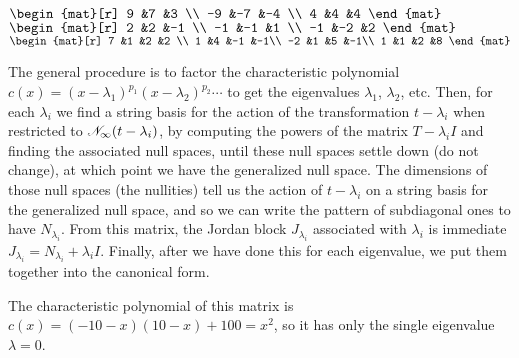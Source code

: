 \begin{exercises}
\begin{exparts}
      \partsitem
        \(
        \begin{mat}[r]
           9   &7    &3  \\
          -9   &-7   &-4 \\
           4   &4    &4
        \end{mat} \)
      \partsitem 
        \(
        \begin{mat}[r]
           2   &2    &-1 \\
          -1   &-1   &1  \\
          -1   &-2   &2
        \end{mat} \)
      \partsitem 
        \(
        \begin{mat}[r]
           7   &1    &2   &2 \\
           1   &4    &-1  &-1\\
          -2   &1    &5   &-1\\
           1   &1    &2   &8
        \end{mat} \)
    \end{exparts}
    \begin{answer}
      The general procedure is to factor the characteristic polynomial 
      $c(x)=(x-\lambda_1)^{p_1}(x-\lambda_2)^{p_2}\cdots $ 
      to get the eigenvalues $\lambda_1$, $\lambda_2$, etc. 
      Then, for each $\lambda_i$ we find a 
      string basis for the action of the transformation $t-\lambda_i$
      when restricted to $\mathscr{N}_\infty(t-\lambda_i)$,
      by computing the powers of the matrix $T-\lambda_iI$ and finding
      the associated null spaces, until these null spaces settle down
      (do not change), at which point we have the generalized null space.
      The dimensions of those null spaces (the nullities) tell us the
      action of $t-\lambda_i$ on a string basis for the generalized
      null space, and so we can write the pattern of subdiagonal ones
      to have $N_{\lambda_i}$.
      From this matrix, the Jordan block $J_{\lambda_i}$ associated
      with $\lambda_i$ is immediate $J_{\lambda_i}=N_{\lambda_i}+\lambda_iI$.
      Finally, after we have done this for each eigenvalue, we put them
      together into the canonical form.
      \begin{exparts}
        \partsitem The characteristic polynomial of this matrix
           is $c(x)=(-10-x)(10-x)+100=x^2$, 
           so it has only the single eigenvalue $\lambda=0$.
           \begin{center}
             \renewcommand{\arraystretch}{1.25}
             \begin{tabular}{r|ccc}

\end{tabular}
\end{center}
\end{exparts}
\end{answer}
\end{exercises}
